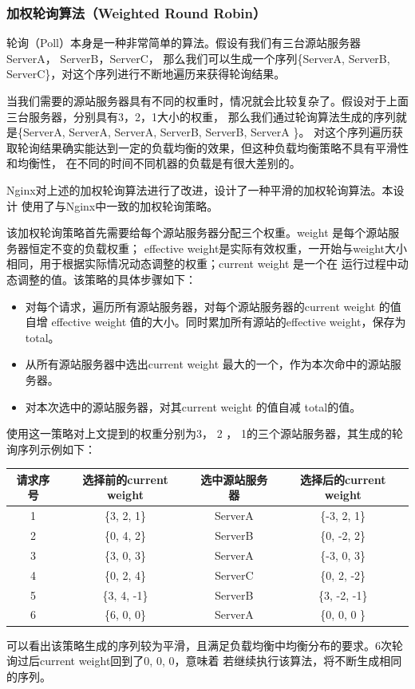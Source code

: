 \documentclass[twoside]{CUGThesis}
\begin{document}
	\subsubsection{加权轮询算法（Weighted Round Robin）}
	轮询（Poll）本身是一种非常简单的算法。假设有我们有三台源站服务器ServerA， ServerB，ServerC，
	那么我们可以生成一个序列\{ServerA, ServerB, ServerC\}，对这个序列进行不断地遍历来获得轮询结果。\par 
	当我们需要的源站服务器具有不同的权重时，情况就会比较复杂了。假设对于上面三台服务器，分别具有3，2，1大小的权重，
	那么我们通过轮询算法生成的序列就是\{ServerA, ServerA, ServerA, ServerB, ServerB, ServerA \}。
	对这个序列遍历获取轮询结果确实能达到一定的负载均衡的效果，但这种负载均衡策略不具有平滑性和均衡性，
	在不同的时间不同机器的负载是有很大差别的。\par 
	Nginx对上述的加权轮询算法进行了改进，设计了一种平滑的加权轮询算法\cite{wrr}。本设计
	使用了与Nginx中一致的加权轮询策略。\par 
	该加权轮询策略首先需要给每个源站服务器分配三个权重。weight 是每个源站服务器恒定不变的负载权重；
	effective weight是实际有效权重，一开始与weight大小相同，用于根据实际情况动态调整的权重；current weight 是一个在
	运行过程中动态调整的值。该策略的具体步骤如下：
	\begin{itemize}
		\item 对每个请求，遍历所有源站服务器，对每个源站服务器的current weight 的值自增 effective weight 值的大小。同时累加所有源站的effective weight，保存为total。
		\item 从所有源站服务器中选出current weight 最大的一个，作为本次命中的源站服务器。
		\item 对本次选中的源站服务器，对其current weight 的值自减 total的值。
	\end{itemize}
	\par
	使用这一策略对上文提到的权重分别为3， 2 ， 1的三个源站服务器，其生成的轮询序列示例如下：\\
	\begin{tabular}{|c|c|c|c|} 
		\hline
		请求序号 & 选择前的current weight & 选中源站服务器 & 选择后的current weight  \\ \hline
		1 & \{3, 2, 1\} & ServerA & \{-3, 2, 1\} \\ \hline
		2 & \{0, 4, 2\} & ServerB & \{0, -2, 2\} \\ \hline
		3 & \{3, 0, 3\} & ServerA & \{-3, 0, 3\} \\ \hline
		4 & \{0, 2, 4\} & ServerC & \{0, 2, -2\} \\ \hline
		5 & \{3, 4, -1\} & ServerB & \{3, -2, -1\} \\ \hline
		6 & \{6, 0, 0\}  & ServerA & \{0, 0, 0 \} \\
		\hline
	\end{tabular}
	\par
	可以看出该策略生成的序列较为平滑，且满足负载均衡中均衡分布的要求。6次轮询过后current weight回到了{0, 0, 0}，意味着
	若继续执行该算法，将不断生成相同的序列。
\end{document}
